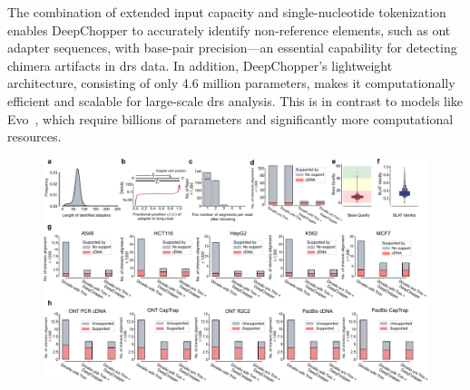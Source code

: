 \documentclass[pdflatex,sn-nature, lineno]{sn-jnl}%
\begin{document}
The combination of extended input capacity and single-nucleotide tokenization enables DeepChopper to accurately identify non-reference elements, such as \gls{ont} adapter sequences, with base-pair precision—an essential capability for detecting chimera artifacts in \gls{drs} data.
In addition, DeepChopper’s lightweight architecture, consisting of only 4.6 million parameters, makes it computationally efficient and scalable for large-scale \gls{drs} analysis.
This is in contrast to models like Evo\mbox{~\cite{nguyen2024sequence}}, which require billions of parameters and significantly more computational resources.

\begin{figure}[!ht]
	\includegraphics[height=0.6\columnwidth]{finals/figure2}

\end{figure}
\end{document}
